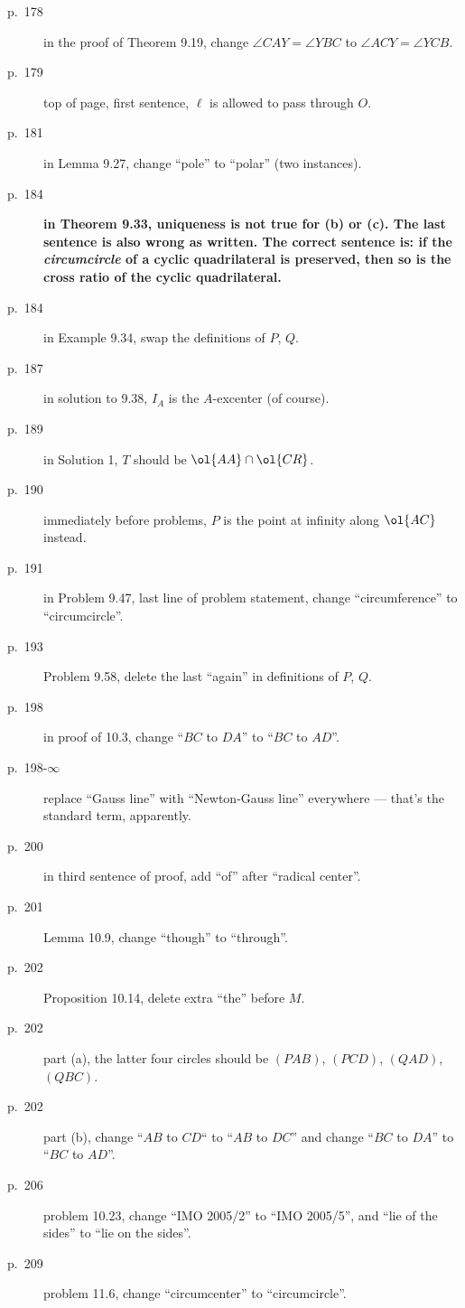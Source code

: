 \documentclass[11pt]{scrartcl}
\newcommand{\crucial}[1]{\textbf{\sffamily\large\color{red} #1}}
\begin{document}
\begin{description}
\item[p.\  178] in the proof of Theorem 9.19, change $\angle CAY = \angle YBC$ to $\angle ACY = \angle YCB$.
\item[p.\  179] top of page, first sentence, $\ell$ is allowed to pass through $O$.
\item[p.\  181] in Lemma 9.27, change ``pole'' to ``polar'' (two instances).
\item[p.\  184] \crucial{in Theorem 9.33,
  uniqueness is not true for (b) or (c).
  The last sentence is also wrong as written.
  The correct sentence is: if the \emph{circumcircle} of a cyclic quadrilateral is preserved,
  then so is the cross ratio of the cyclic quadrilateral.}
\item[p.\  184] in Example 9.34, swap the definitions of $P$, $Q$.
\item[p.\  187] in solution to 9.38, $I_A$ is the $A$-excenter (of course).
\item[p.\  189] in Solution 1, $T$ should be $\ol{AA} \cap \ol{CR}$.
\item[p.\  190] immediately before problems, $P$ is the point at infinity along $\ol{AC}$ instead.
\item[p.\  191] in Problem 9.47, last line of problem statement,
  change ``circumference'' to ``circumcircle''.
\item[p.\  193] Problem 9.58, delete the last ``again'' in definitions of $P$, $Q$.
\item[p.\  198] in proof of 10.3, change ``$BC$ to $DA$'' to ``$BC$ to $AD$''.
\item[p.\  198-$\infty$] replace ``Gauss line'' with ``Newton-Gauss line''
  everywhere --- that's the standard term, apparently.
\item[p.\  200] in third sentence of proof, add ``of'' after ``radical center''.
\item[p.\  201] Lemma 10.9, change ``though'' to ``through''.
\item[p.\  202] Proposition 10.14, delete extra ``the'' before $M$.
\item[p.\  202] part (a), the latter four circles should be
  $(PAB)$, $(PCD)$, $(QAD)$, $(QBC)$.
\item[p.\  202] part (b), change ``$AB$ to $CD$`` to ``$AB$ to $DC$''
  and change ``$BC$ to $DA$'' to ``$BC$ to $AD$''.
\item[p.\  206] problem 10.23, change ``IMO 2005/2'' to ``IMO 2005/5'',
  and ``lie of the sides'' to ``lie on the sides''.
\item[p.\  209] problem 11.6, change ``circumcenter'' to ``circumcircle''.

\end{description}
\end{document}

